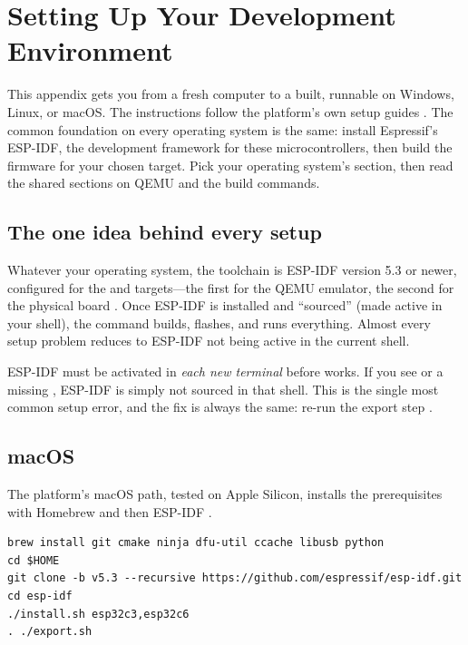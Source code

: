 \chapter{Setting Up Your Development Environment}
\label{app:env}

This appendix gets you from a fresh computer to a built, runnable \prg on Windows,
Linux, or macOS. The instructions follow the platform's own setup guides
\citep{prg32repo}. The common foundation on every operating system is the same:
install Espressif's ESP-IDF, the development framework for these \riscv
microcontrollers, then build the firmware for your chosen target. Pick your
operating system's section, then read the shared sections on QEMU and the build
commands.

\section{The one idea behind every setup}

Whatever your operating system, the toolchain is ESP-IDF version 5.3 or newer,
configured for the  and  targets---the first for the
QEMU emulator, the second for the physical board \citep{prg32repo,prg32qemu}. Once
ESP-IDF is installed and ``sourced'' (made active in your shell), the command
 builds, flashes, and runs everything. Almost every setup problem
reduces to ESP-IDF not being active in the current shell.

\begin{prgwarn}
ESP-IDF must be activated in \emph{each new terminal} before  works.
If you see  or a missing ,
ESP-IDF is simply not sourced in that shell. This is the single most common
setup error, and the fix is always the same: re-run the export step
\citep{prg32repo}.
\end{prgwarn}

\section{macOS}

The platform's macOS path, tested on Apple Silicon, installs the prerequisites with
Homebrew and then ESP-IDF \citep{prg32repo}.

\begin{lstlisting}[style=bash,caption={macOS setup with Homebrew and ESP-IDF.}]
brew install git cmake ninja dfu-util ccache libusb python
cd $HOME
git clone -b v5.3 --recursive https://github.com/espressif/esp-idf.git
cd esp-idf
./install.sh esp32c3,esp32c6
. ./export.sh
\end{lstlisting}


